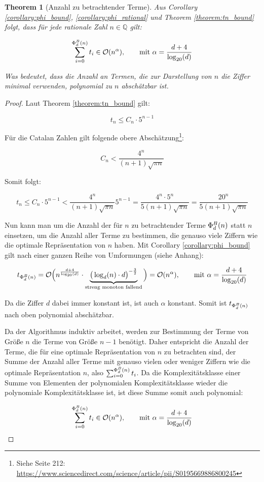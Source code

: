 \documentclass{article}
\newtheorem{theorem}{Theorem}[section]
\theoremstyle{nonumberplain}
\newtheorem{proof}{Beweis}
\begin{document}
\begin{theorem}[Anzahl zu betrachtender Terme]\label{theorem:tn_of_phi}
    Aus Corollary \ref{corollary:phi_bound}, \ref{corollary:phi_rational} und Theorem \ref{theorem:tn_bound} folgt, dass für jede rationale Zahl \(n\in\mathbb{Q}\) gilt:

        \[\sum_{i=0}^{\Phi_{d}^{B}(n)} t_i \in \mathcal{O}(n^{\alpha}),\qquad\text{mit }\alpha=\frac{d+4}{\log_{20}(d)}\]

    Was bedeutet, dass die Anzahl an Termen, die zur Darstellung von \(n\) die Ziffer minimal verwenden, polynomial zu \(n\) abschätzbar ist.
\end{theorem}
\begin{proof}
    Laut Theorem \ref{theorem:tn_bound} gilt:

        \[t_n \leq C_n \cdot 5^{n-1}\]

    Für die Catalan Zahlen gilt folgende obere Abschätzung\footnote{Siehe Seite 212: \url{https://www.sciencedirect.com/science/article/pii/S0195669886800245}}:

        \[C_n < \frac{4^n}{(n+1)\sqrt{\pi n}}\]

    Somit folgt:

        \[t_n \leq C_n \cdot 5^{n-1} < \frac{4^n}{(n+1)\sqrt{\pi n}} 5^{n-1} = \frac{4^n \cdot 5^n}{5(n+1)\sqrt{\pi n}} = \frac{20^n}{5(n+1)\sqrt{\pi n}}\]

    Nun kann man um die Anzahl der für \(n\) zu betrachtender Terme \(\Phi_{d}^{B}(n)\) statt \(n\) einsetzen, um die Anzahl aller Terme zu bestimmen, die genauso viele Ziffern wie die optimale Repräsentation von \(n\) haben.
    Mit Corollary \ref{corollary:phi_bound} gilt nach einer ganzen Reihe von Umformungen (siehe Anhang):
    
    \begin{equation}
        t_{\Phi_{d}^{B}(n)}
        = \mathcal{O}\Big(n^{\frac{d+4}{\log_{20}(d)}} \cdot \underbrace{\big(\log_d(n) \cdot d\big)^{-\frac{3}{2}}}_{\text{streng monoton fallend}}\Big) \\
        = \mathcal{O}(n^{\alpha}),\qquad\text{mit }\alpha=\frac{d+4}{\log_{20}(d)}
    \end{equation}

    Da die Ziffer \(d\) dabei immer konstant ist, ist auch \(\alpha\) konstant.
    Somit ist \(t_{\Phi_{d}^{B}(n)}\) nach oben polynomial abschätzbar.
    \pagebreak
    
    Da der Algorithmus induktiv arbeitet, werden zur Bestimmung der Terme von Größe \(n\) die Terme von Größe \(n-1\) benötigt.
    Daher entspricht die Anzahl der Terme, die für eine optimale Repräsentation von \(n\) zu betrachten sind, der Summe der Anzahl aller Terme mit genauso vielen oder weniger Ziffern wie die optimale Repräsentation \(n\), also \(\sum_{i=0}^{\Phi_{d}^{B}(n)} t_i\). Da die Komplexitätsklasse einer Summe von Elementen der polynomialen Komplexitätsklasse wieder die polynomiale Komplexitätsklasse ist, ist diese Summe somit auch polynomial:

    \[\sum_{i=0}^{\Phi_{d}^{B}(n)} t_i \in \mathcal{O}(n^{\alpha}),\qquad\text{mit }\alpha=\frac{d+4}{\log_{20}(d)}\]
\end{proof}
\end{document}
